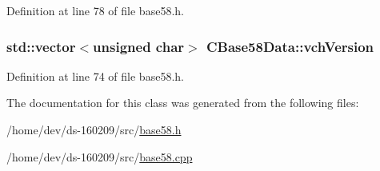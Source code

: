 Definition at line 78 of file base58.\+h.

\hypertarget{class_c_base58_data_a110c1008f399053098a1bdf63408e923}{}
\subsubsection[{vch\+Version}]{\setlength{\rightskip}{0pt plus 5cm}std\+::vector$<$unsigned char$>$ C\+Base58\+Data\+::vch\+Version\hspace{0.3cm}{\ttfamily [protected]}}\label{class_c_base58_data_a110c1008f399053098a1bdf63408e923}


Definition at line 74 of file base58.\+h.



The documentation for this class was generated from the following files\+:\begin{DoxyCompactItemize}
\item 
/home/dev/ds-\/160209/src/\hyperlink{base58_8h}{base58.\+h}\item 
/home/dev/ds-\/160209/src/\hyperlink{base58_8cpp}{base58.\+cpp}\end{DoxyCompactItemize}
